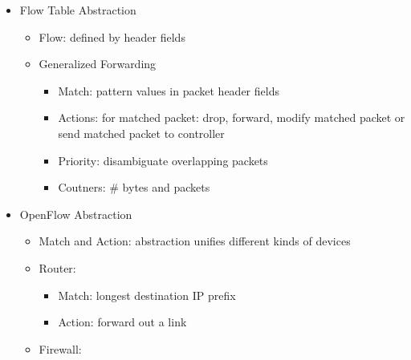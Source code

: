 \begin{itemize}
\begin{itemize}
\begin{itemize}
        \end{itemize}

    \end{itemize}

  \item Flow Table Abstraction

    \begin{itemize}

      \item Flow: defined by header fields

      \item Generalized Forwarding

        \begin{itemize}

          \item Match: pattern values in packet header fields

          \item Actions: for matched packet: drop, forward, modify matched packet or send matched packet to controller

          \item Priority: disambiguate overlapping packets

          \item Coutners: \# bytes and packets

        \end{itemize}

    \end{itemize}

  \item OpenFlow Abstraction

    \begin{itemize}

      \item Match and Action: abstraction unifies different kinds of devices

      \item Router:

        \begin{itemize}

          \item Match: longest destination IP prefix

          \item Action: forward out a link

        \end{itemize}

      \item Firewall:


\end{itemize}
\end{itemize}
